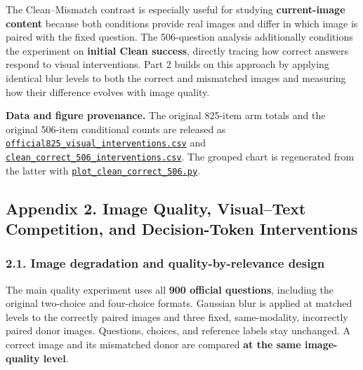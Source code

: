 \documentclass[
  10pt,
  a4paper,
]{article}
\begin{document}
The Clean--Mismatch contrast is especially useful for studying
\textbf{current-image content} because both conditions provide real
images and differ in which image is paired with the fixed question. The
506-question analysis additionally conditions the experiment on
\textbf{initial Clean success}, directly tracing how correct answers
respond to visual interventions. Part 2 builds on this approach by
applying identical blur levels to both the correct and mismatched images
and measuring how their difference evolves with image quality.

\textbf{Data and figure provenance.} The original 825-item arm totals
and the original 506-item conditional counts are released as
\href{https://github.com/bbuller591-sketch/medical-vlm-visual-reliance/blob/main/results/official825_visual_interventions.csv}{\texttt{official825\_visual\_interventions.csv}}
and
\href{https://github.com/bbuller591-sketch/medical-vlm-visual-reliance/blob/main/results/clean_correct_506_interventions.csv}{\texttt{clean\_correct\_506\_interventions.csv}}.
The grouped chart is regenerated from the latter with
\href{https://github.com/bbuller591-sketch/medical-vlm-visual-reliance/blob/main/scripts/plot_clean_correct_506.py}{\texttt{plot\_clean\_correct\_506.py}}.

\subsection{Appendix 2. Image Quality, Visual--Text Competition, and
Decision-Token
Interventions}\label{appendix-2.-image-quality-visualtext-competition-and-decision-token-interventions}

\subsubsection{2.1. Image degradation and quality-by-relevance
design}\label{image-degradation-and-quality-by-relevance-design}

The main quality experiment uses all \textbf{900 official questions},
including the original two-choice and four-choice formats. Gaussian blur
is applied at matched levels to the correctly paired images and three
fixed, same-modality, incorrectly paired donor images. Questions,
choices, and reference labels stay unchanged. A correct image and its
mismatched donor are compared \textbf{at the same image-quality level}.
\end{document}
